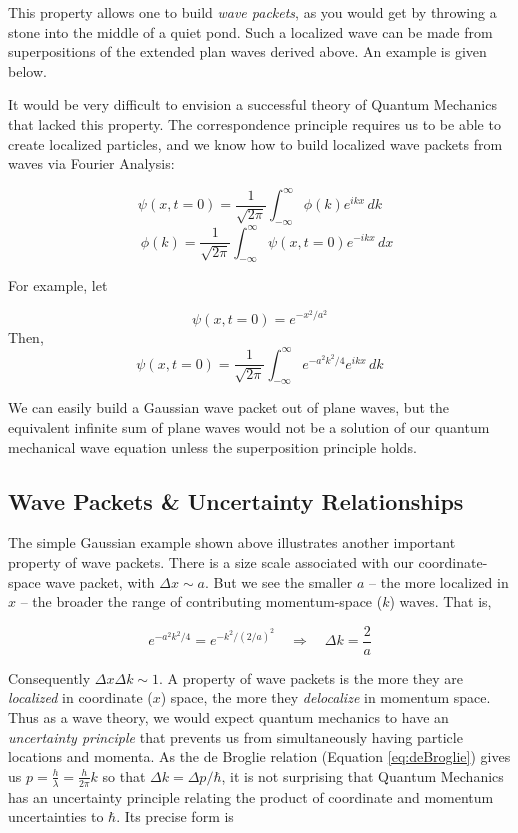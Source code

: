 This property allows one to build \textit{wave packets}, as you would get by
throwing a stone into the middle of a quiet pond. Such a localized wave can be
made from superpositions of the extended plan waves derived above. An example
is given below. 

It would be very difficult to envision a successful theory of Quantum Mechanics
that lacked this property. The correspondence principle requires us to be able
to create localized particles, and we know how to build localized wave packets
from waves via Fourier Analysis: 

\[
  \psi(x, t=0) = \frac{1}{\sqrt{2\pi}}\int_{-\infty}^{\infty} \phi(k)e^{ikx}\,
dk \] \[ \quad \phi(k) = \frac{1}{\sqrt{2\pi}}\int_{-\infty}^{\infty} \psi(x,
t=0)e^{-ikx}\, dx\] \vspace{3px}

For example, let

\[
\psi(x, t=0) = e^{-x^2 / a^2} \] Then, \[ \psi(x, t=0)
  = \frac{1}{\sqrt{2\pi}}\int_{-\infty}^{\infty} e^{-a^2k^2/4}e^{ikx} \, dk
\] \vspace{3px}

We can easily build a Gaussian wave packet out of plane waves, but the
equivalent infinite sum of plane waves would not be a solution of our quantum mechanical
wave equation unless the superposition principle holds. 

\subsection{Wave Packets \& Uncertainty Relationships}

The simple Gaussian example shown above illustrates another important property
of wave packets. There is a size scale associated with our coordinate-space
wave packet, with $\Delta x \sim a$. But we see the smaller $a$ -- the more
localized in $x$ -- the broader the range of contributing momentum-space ($k$)
waves. That is, 

\[
  e^{-a^2k^2/4} = e^{-k^2 / (2/a)^2} \quad \Rightarrow \quad \Delta k = \frac{2}{a}
\] \vspace{3px}

Consequently $\Delta x \Delta k \sim 1$. A property of wave packets is the more
they are \textit{localized} in coordinate ($x$) space, the more they
\textit{delocalize} in momentum space. Thus as a wave  theory, we would expect
quantum mechanics to have an \textit{uncertainty principle} that prevents us
from simultaneously having particle locations and momenta. As the de Broglie
relation (Equation \ref{eq:deBroglie}) gives us $p = \frac{h}{\lambda}
= \frac{h}{2\pi}k$ so that $\Delta k = \Delta p / \hbar$, it is not surprising
that Quantum Mechanics has an uncertainty principle relating the product of
coordinate and momentum uncertainties to $\hbar$. Its precise form is 

